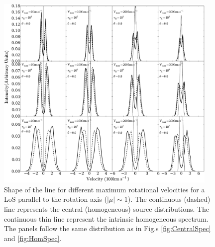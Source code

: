 \begin{figure}
\begin{center}
\includegraphics[width=0.95\textwidth]{Figures/f4-2.pdf}
\end{center}
\caption{Shape of the \ly line for different maximum rotational
velocities for a LoS parallel to the rotation axis
($|\mu|\sim 1$). The continuous (dashed) line represents the central
(homogeneous) source distributions. The continuous thin line
represent the intrinsic homogeneous spectrum. The panels follow the same
distribution as in Fig.s \ref{fig:CentralSpec} and \ref{fig:HomSpec}.
\label{fig:differentvelocities2}}
\end{figure}

